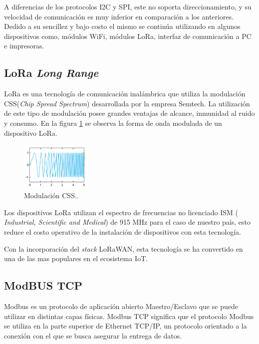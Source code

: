 A diferencias de los protocolos I2C y  SPI, este no soporta direccionamiento, y su velocidad de comunicación es muy inferior en comparación a los anteriores. Dedido a su sencillez y bajo costo el mismo se continúa utilizando en algunos dispositivos como, módulos WiFi, módulos LoRa, interfaz de comunicación a PC e impresoras.

\subsection{LoRa \textit{Long Range}}

LoRa es una tecnología de comunicación inalámbrica que utiliza la modulación CSS(\textit{Chip Spread Spectrum}) desarrollada por la empresa Semtech. 
La utilización de este tipo de modulación posee grandes ventajas de alcance, inmunidad al ruido y consumo.
En la figura \ref{fig:LoRa} se observa la forma de onda modulada de un dispositivo LoRa. 

\begin{figure}[htbp]
	\centering
	\includegraphics[width=0.3\textwidth]{./Figures/LoRa.png}
	\caption{Modulación CSS.\protect\footnotemark.}
	\label{fig:LoRa}
\end{figure} 

Los dispositivos LoRa utilizan el espectro de frecuencias no licenciado ISM ( \textit{Industrial, Scientific and Medical}) de 915 MHz para el caso de nuestro país, esto reduce el costo operativo de la instalación de dispositivos con esta tecnología.

Con la incorporación del \textit{stack} LoRaWAN, esta tecnología se ha convertido en una de las mas populares en el ecosistema IoT.


\subsection{ModBUS TCP}

Modbus es un protocolo de aplicación abierto Maestro/Esclavo que se puede utilizar en distintas capas físicas. 
Modbus TCP significa que el protocolo Modbus se utiliza en la parte superior de Ethernet TCP/IP, un protocolo orientado a la conexión con el que se busca asegurar la entrega de datos.

